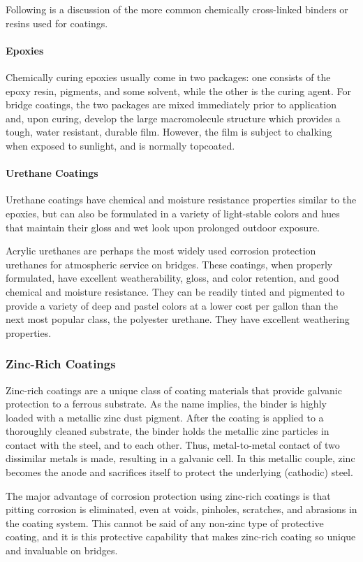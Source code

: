 Following is a discussion of the more common chemically cross-linked binders or resins used for coatings.

\paragraph{Epoxies}
Chemically curing epoxies usually come in two packages: one consists of the epoxy resin, pigments, and some
solvent, while the other is the curing agent. For bridge coatings, the two packages are mixed immediately prior to
application and, upon curing, develop the large macromolecule structure which provides a tough, water resistant,
durable film. However, the film is subject to chalking when exposed to sunlight, and is normally topcoated.

\paragraph{Urethane Coatings}
Urethane coatings have chemical and moisture resistance properties similar to the epoxies, but can also be
formulated in a variety of light-stable colors and hues that maintain their gloss and wet look upon prolonged outdoor
exposure.

Acrylic urethanes are perhaps the most widely used corrosion protection urethanes for atmospheric service on
bridges. These coatings, when properly formulated, have excellent weatherability, gloss, and color retention, and
good chemical and moisture resistance. They can be readily tinted and pigmented to provide a variety of deep and
pastel colors at a lower cost per gallon than the next most popular class, the polyester urethane. They have excellent
weathering properties.

\subsubsection{Zinc-Rich Coatings}
Zinc-rich coatings are a unique class of coating materials that provide galvanic protection to a ferrous substrate.
As the name implies, the binder is highly loaded with a metallic zinc dust pigment. After the coating is applied to a
thoroughly cleaned substrate, the binder holds the metallic zinc particles in contact with the steel, and to each other.
Thus, metal-to-metal contact of two dissimilar metals is made, resulting in a galvanic cell. In this metallic couple,
zinc becomes the anode and sacrifices itself to protect the underlying (cathodic) steel.

The major advantage of corrosion protection using zinc-rich coatings is that pitting corrosion is eliminated, even
at voids, pinholes, scratches, and abrasions in the coating system. This cannot be said of any non-zinc type of
protective coating, and it is this protective capability that makes zinc-rich coating so unique and invaluable on
bridges.

